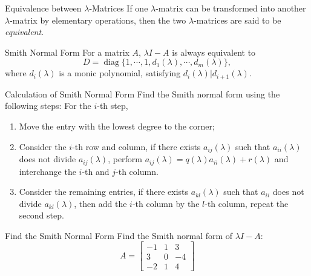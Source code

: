 \begin{definition}{Equivalence between $\lambda$-Matrices}{}
  If one $\lambda$-matrix can be transformed into another $\lambda$-matrix
  by elementary operations, then the two $\lambda$-matrices are said to be
  \emph{equivalent}.
\end{definition}

\begin{theorem}{Smith Normal Form}{}
  For a matrix $A$, $\lambda I - A$ is always equivalent to
  \begin{equation}
    D = \operatorname{diag}\{1, \cdots, 1, d_1(\lambda), \cdots, d_m(\lambda)\},
  \end{equation}
  where $d_i(\lambda)$ is a monic polynomial, satisfying
  $d_i(\lambda)|d_{i+1}(\lambda)$.
\end{theorem}

\begin{proposition}{Calculation of Smith Normal Form}{}
  Find the Smith normal form using the following steps: For the $i$-th step,
  \begin{enumerate}
  \item Move the entry with the lowest degree to the corner;
  \item Consider the $i$-th row and column, if there exists $a_{ij}(\lambda)$ such that
    $a_{ii}(\lambda)$ does not divide $a_{ij}(\lambda)$,
    perform $a_{ij}(\lambda) = q(\lambda)a_{ii}(\lambda) + r(\lambda)$
    and interchange the $i$-th and $j$-th column.
  \item Consider the remaining entries, if there exists $a_{kl}(\lambda)$ such that
    $a_{ii}$ does not divide $a_{kl}(\lambda)$, then add the $i$-th column by
    the $l$-th column, repeat the second step.
  \end{enumerate}
\end{proposition}

\begin{example}{Find the Smith Normal Form}{}
  Find the Smith normal form of $\lambda I - A$:
  \begin{equation}
    A =
    \begin{bmatrix}
      -1 & 1 & 3\\
      3 & 0 & -4\\
      -2 & 1 & 4
    \end{bmatrix}
  \end{equation}
\end{example}

